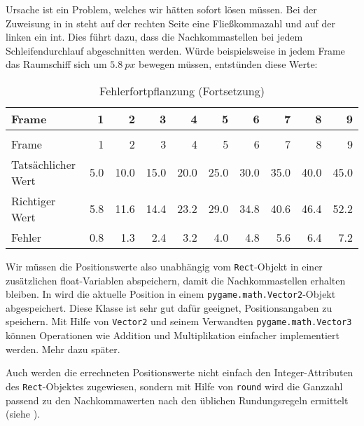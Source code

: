 Ursache ist ein Problem, welches wir hätten sofort lösen müssen. Bei der Zuweisung in  in  steht auf der rechten Seite eine Fließkommazahl und auf der linken ein \gls{int}. Dies führt dazu, dass die Nachkommastellen bei jedem Schleifendurchlauf abgeschnitten werden. Würde beispielsweise in jedem Frame das Raumschiff sich um $5.8~px$ bewegen müssen, entstünden diese Werte:

\begin{longtable}{lrrrrrrrrr}
	\caption{Fehlerfortpflanzung}\label{tabFpsBewegung04} \\[1em]
    Frame & 1 & 2  & 3  & 4 & 5 &  6 & 7 & 8 & 9 \\[0.5em]\hline\hline
	\hline
	\endfirsthead %
	\caption{Fehlerfortpflanzung (Fortsetzung)}\\[1em]
    Frame & 1 & 2  & 3  & 4 & 5 &  6 & 7 & 8 & 9 \\[0.5em]\hline\hline
	\hline
	\endhead %
	Tatsächlicher Wert  & 5.0 & 10.0 & 15.0 & 20.0 & 25.0 & 30.0 & 35.0 & 40.0 & 45.0 \\ \hline
	Richtiger Wert      & 5.8 & 11.6 & 14.4 & 23.2 & 29.0 & 34.8 & 40.6 & 46.4 & 52.2 \\ \hline
	Fehler              & 0.8 & 1.3 & 2.4 & 3.2 & 4.0 & 4.8 & 5.6 & 6.4 & 7.2 \\ \hline
\end{longtable} 

Wir müssen die Positionswerte also unabhängig vom \texttt{Rect}-Objekt in einer zusätzlichen float-Variablen abspeichern, damit die Nachkommastellen erhalten bleiben. In  wird die aktuelle Position in einem \texttt{pygame.math.Vector2}-Objekt abgespeichert. Diese Klasse ist sehr gut dafür geeignet, Positionsangaben zu speichern. Mit Hilfe von \texttt{Vector2} und seinem Verwandten \texttt{pygame.math.Vector3} können Operationen wie Addition und Multiplikation einfacher implementiert werden. Mehr dazu später. 

\newpage
Auch werden die errechneten Positionswerte nicht einfach den Integer-Attributen des \texttt{Rect}-Objektes zugewiesen, sondern mit Hilfe von \texttt{round} wird die Ganzzahl passend zu den Nachkommawerten nach den üblichen Rundungsregeln ermittelt (siehe ). 


